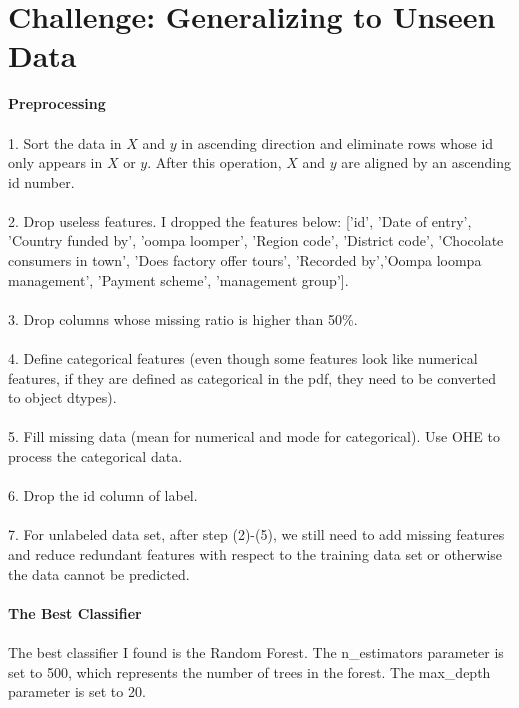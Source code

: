 \documentclass{article}
\begin{document}
        \section{Challenge: Generalizing to Unseen Data}
        \textbf{Preprocessing}\\\\
        1. Sort the data in $X$ and $y$ in ascending direction and eliminate rows whose id only appears in $X$ or $y$. After this operation, $X$ and $y$ are aligned by an ascending id number.\\\\
        2. Drop useless features. I dropped the features below: ['id', 'Date of entry', 'Country funded by', 'oompa loomper', 'Region code', 'District code', 'Chocolate consumers in town', 'Does factory offer tours', 'Recorded by','Oompa loompa management', 'Payment scheme', 'management group'].\\\\
        3. Drop columns whose missing ratio is higher than 50\%.\\\\
        4. Define categorical features (even though some features look like numerical features, if they are defined as categorical in the pdf, they need to be converted to object dtypes).\\\\
        5. Fill missing data (mean for numerical and mode for categorical). Use OHE to process the categorical data.\\\\
        6. Drop the id column of label.\\\\
        7. For unlabeled data set, after step (2)-(5), we still need to add missing features and reduce redundant features with respect to the training data set or otherwise the data cannot be predicted.\\\\
        
        \noindent 
        \textbf{The Best Classifier}\\\\
        The best classifier I found is the Random Forest. The n\_estimators parameter is set to 500, which represents the number of trees in the forest. The max\_depth parameter is set to 20.
        
\end{document}

